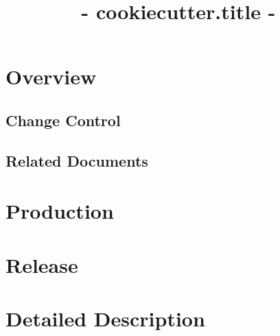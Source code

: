 \documentclass[DP]{spherex}
\title{ {{- cookiecutter.title -}} }
\begin{document}
\maketitle

\begin{dochistory}
\end{dochistory}

\section{Overview}


\subsection{Change Control}


\subsection{Related Documents}


\section{Production}


\section{Release}


\section{Detailed Description}

% 


\end{document}
